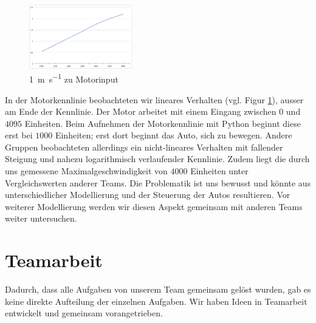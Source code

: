 \documentclass[10pt]{article}
\begin{document}
    \begin{figure}
        \centering
        \includegraphics[width=0.4\textwidth]{bild_tim}
        \caption{\SI{1}{\meter\per\second} zu Motorinput}
        \label{fig:m_p_s_zu_motorinput}
    \end{figure}
    In der Motorkennlinie beobachteten wir lineares Verhalten (vgl. Figur \ref{fig:m_p_s_zu_motorinput}), ausser am Ende der Kennlinie.
    Der Motor arbeitet mit einem Eingang zwischen $0$ und $4095$ Einheiten.
    Beim Aufnehmen der Motorkennlinie mit Python beginnt diese erst bei $1000$ Einheiten;
    erst dort beginnt das Auto, sich zu bewegen.
    Andere Gruppen beobachteten allerdings ein nicht-lineares Verhalten mit fallender Steigung und nahezu logarithmisch verlaufender Kennlinie.
    Zudem liegt die durch uns gemessene Maximalgeschwindigkeit von $4000$ Einheiten unter Vergleichswerten anderer Teams.
    Die Problematik ist uns bewusst und könnte aus unterschiedlicher Modellierung und der Steuerung der Autos resultieren.
    Vor weiterer Modellierung werden wir diesen Aspekt gemeinsam mit anderen Teams weiter untersuchen.


\section{Teamarbeit} %
\label{sec:teamarbeit}
Dadurch, dass alle Aufgaben von unserem Team gemeinsam gelöst wurden, gab es keine direkte Aufteilung der einzelnen Aufgaben. Wir haben Ideen in Teamarbeit entwickelt und gemeinsam vorangetrieben.
\end{document}
